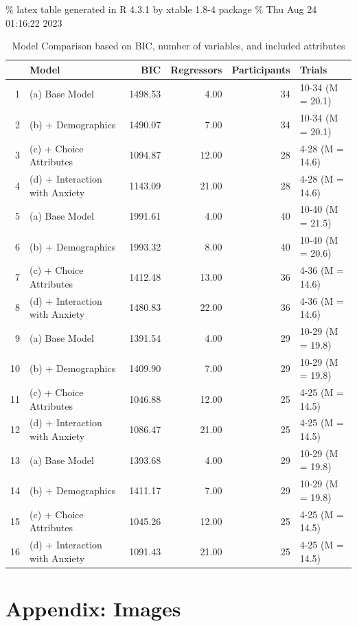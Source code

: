 \documentclass[
]{article}
\begin{document}
\% latex table generated in R 4.3.1 by xtable 1.8-4 package \% Thu Aug
24 01:16:22 2023

\hypertarget{tbl-sensitivity}{}
\begin{table}[ht]
\caption{\label{tbl-sensitivity}Model Comparison based on BIC, number of variables, and included
attributes }\tabularnewline

\centering
\begin{tabular}{rlrrrl}
  \hline
 & Model & BIC & Regressors & Participants & Trials \\ 
  \hline
1 & (a) Base Model & 1498.53 & 4.00 &  34 & 10-34 (M = 20.1) \\ 
  2 & (b) + Demographics & 1490.07 & 7.00 &  34 & 10-34 (M = 20.1) \\ 
  3 & (c) + Choice Attributes & 1094.87 & 12.00 &  28 & 4-28 (M = 14.6) \\ 
  4 & (d) + Interaction with Anxiety & 1143.09 & 21.00 &  28 & 4-28 (M = 14.6) \\ 
  5 & (a) Base Model & 1991.61 & 4.00 &  40 & 10-40 (M = 21.5) \\ 
  6 & (b) + Demographics & 1993.32 & 8.00 &  40 & 10-40 (M = 20.6) \\ 
  7 & (c) + Choice Attributes & 1412.48 & 13.00 &  36 & 4-36 (M = 14.6) \\ 
  8 & (d) + Interaction with Anxiety & 1480.83 & 22.00 &  36 & 4-36 (M = 14.6) \\ 
  9 & (a) Base Model & 1391.54 & 4.00 &  29 & 10-29 (M = 19.8) \\ 
  10 & (b) + Demographics & 1409.90 & 7.00 &  29 & 10-29 (M = 19.8) \\ 
  11 & (c) + Choice Attributes & 1046.88 & 12.00 &  25 & 4-25 (M = 14.5) \\ 
  12 & (d) + Interaction with Anxiety & 1086.47 & 21.00 &  25 & 4-25 (M = 14.5) \\ 
  13 & (a) Base Model & 1393.68 & 4.00 &  29 & 10-29 (M = 19.8) \\ 
  14 & (b) + Demographics & 1411.17 & 7.00 &  29 & 10-29 (M = 19.8) \\ 
  15 & (c) + Choice Attributes & 1045.26 & 12.00 &  25 & 4-25 (M = 14.5) \\ 
  16 & (d) + Interaction with Anxiety & 1091.43 & 21.00 &  25 & 4-25 (M = 14.5) \\ 
   \hline
\end{tabular}
\end{table}

\hypertarget{appendix-images}{%
\section{Appendix: Images}\label{appendix-images}}
\end{document}
